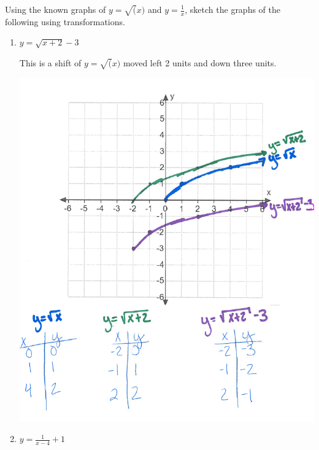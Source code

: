 \documentclass[nooutcomes, noinstructornotes]{ximera}
\begin{document}
\begin{problem}
Using the known graphs of $y=\sqrt(x)$ and $y=\frac{1}{x}$, sketch the graphs of the following using transformations.

\begin{enumerate}
 	\item $y=\sqrt{x+2}-3$
	\begin{freeResponse}
		This is a shift of $y=\sqrt(x)$ moved left 2 units and down three units.
	\begin{image}		
	\includegraphics[scale = 0.8]{Figure8.png}
	\end{image}
	\end{freeResponse}
	

	\item $y=\frac{1}{x-4}+1$


\end{enumerate}
\end{problem}
\end{document}
